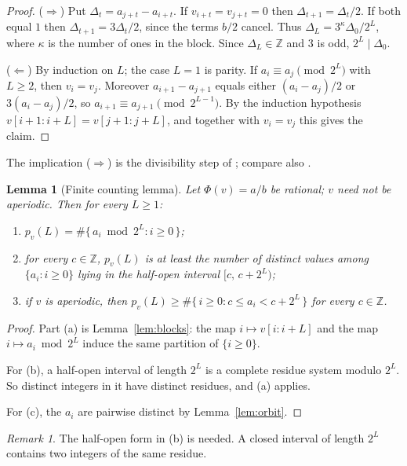 \documentclass[11pt]{amsart}
\newtheorem{lemma}[theorem]{Lemma}
\theoremstyle{definition}
\theoremstyle{remark}
\newtheorem{remark}[theorem]{Remark}
\newcommand{\Z}{\mathbb{Z}}
\begin{document}
\begin{proof}
($\Rightarrow$) Put $\Delta_t=a_{j+t}-a_{i+t}$. If $v_{i+t}=v_{j+t}=0$ then $\Delta_{t+1}=\Delta_t/2$. If both equal $1$ then $\Delta_{t+1}=3\Delta_t/2$, since the terms $b/2$ cancel. Thus $\Delta_L=3^{\kappa}\Delta_0/2^L$, where $\kappa$ is the number of ones in the block. Since $\Delta_L\in\Z$ and $3$ is odd, $2^L\mid\Delta_0$.

($\Leftarrow$) By induction on $L$; the case $L=1$ is parity. If $a_i\equiv a_j\pmod{2^L}$ with $L\ge2$, then $v_i=v_j$. Moreover $a_{i+1}-a_{j+1}$ equals either $(a_i-a_j)/2$ or $3(a_i-a_j)/2$, so $a_{i+1}\equiv a_{j+1}\pmod{2^{L-1}}$. By the induction hypothesis $v[i+1:i+L]=v[j+1:j+L]$, and together with $v_i=v_j$ this gives the claim.
\end{proof}

The implication ($\Rightarrow$) is the divisibility step of \cite[proof of Thm.~5]{Dub09}; compare also \cite{Ter76}.

\begin{lemma}[Finite counting lemma]\label{lem:counting}
Let $\Phi(v)=a/b$ be rational; $v$ need not be aperiodic. Then for every $L\ge1$:
\begin{enumerate}[label=\textup{(\alph*)},leftmargin=2em]
\item $p_v(L)=\#\{\,a_i \bmod 2^L : i\ge0\,\}$;
\item for every $c\in\Z$, $p_v(L)$ is at least the number of distinct values among $\{a_i: i\ge0\}$ lying in the half-open interval $[c,\,c+2^L)$;
\item if $v$ is aperiodic, then $p_v(L)\ge\#\{\,i\ge0: c\le a_i<c+2^L\,\}$ for every $c\in\Z$.
\end{enumerate}
\end{lemma}

\begin{proof}
Part (a) is Lemma~\ref{lem:blocks}: the map $i\mapsto v[i:i+L]$ and the map $i\mapsto a_i\bmod 2^L$ induce the same partition of $\{i\ge0\}$.

For (b), a half-open interval of length $2^L$ is a complete residue system modulo $2^L$. So distinct integers in it have distinct residues, and (a) applies.

For (c), the $a_i$ are pairwise distinct by Lemma~\ref{lem:orbit}.
\end{proof}

\begin{remark}
The half-open form in (b) is needed. A closed interval of length $2^L$ contains two integers of the same residue.
\end{remark}
\end{document}
